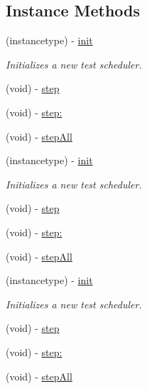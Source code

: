 \subsection*{Instance Methods}
\begin{DoxyCompactItemize}
\item 
\mbox{\label{interface_r_a_c_test_scheduler_abefb74ab14dfb660f84f8fa6e05b3f93}} 
(instancetype) -\/ \mbox{\hyperlink{interface_r_a_c_test_scheduler_abefb74ab14dfb660f84f8fa6e05b3f93}{init}}
\begin{DoxyCompactList}\small\item\em Initializes a new test scheduler. \end{DoxyCompactList}\item 
(void) -\/ \mbox{\hyperlink{interface_r_a_c_test_scheduler_a178d7eadc1d9f6a24e228dbc725d1ede}{step}}
\item 
(void) -\/ \mbox{\hyperlink{interface_r_a_c_test_scheduler_a74b5961a618f9692baf91bbd52ab08e7}{step\+:}}
\item 
(void) -\/ \mbox{\hyperlink{interface_r_a_c_test_scheduler_a2577a57067b00fa4e08414f168359370}{step\+All}}
\item 
\mbox{\label{interface_r_a_c_test_scheduler_abefb74ab14dfb660f84f8fa6e05b3f93}} 
(instancetype) -\/ \mbox{\hyperlink{interface_r_a_c_test_scheduler_abefb74ab14dfb660f84f8fa6e05b3f93}{init}}
\begin{DoxyCompactList}\small\item\em Initializes a new test scheduler. \end{DoxyCompactList}\item 
(void) -\/ \mbox{\hyperlink{interface_r_a_c_test_scheduler_a178d7eadc1d9f6a24e228dbc725d1ede}{step}}
\item 
(void) -\/ \mbox{\hyperlink{interface_r_a_c_test_scheduler_a74b5961a618f9692baf91bbd52ab08e7}{step\+:}}
\item 
(void) -\/ \mbox{\hyperlink{interface_r_a_c_test_scheduler_a2577a57067b00fa4e08414f168359370}{step\+All}}
\item 
\mbox{\label{interface_r_a_c_test_scheduler_abefb74ab14dfb660f84f8fa6e05b3f93}} 
(instancetype) -\/ \mbox{\hyperlink{interface_r_a_c_test_scheduler_abefb74ab14dfb660f84f8fa6e05b3f93}{init}}
\begin{DoxyCompactList}\small\item\em Initializes a new test scheduler. \end{DoxyCompactList}\item 
(void) -\/ \mbox{\hyperlink{interface_r_a_c_test_scheduler_a178d7eadc1d9f6a24e228dbc725d1ede}{step}}
\item 
(void) -\/ \mbox{\hyperlink{interface_r_a_c_test_scheduler_a74b5961a618f9692baf91bbd52ab08e7}{step\+:}}
\item 
(void) -\/ \mbox{\hyperlink{interface_r_a_c_test_scheduler_a2577a57067b00fa4e08414f168359370}{step\+All}}
\end{DoxyCompactItemize}
